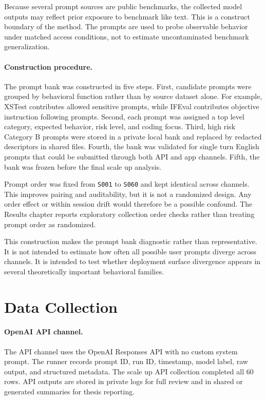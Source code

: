 Because several prompt sources are public benchmarks, the collected model
outputs may reflect prior exposure to benchmark like text. This is a construct
boundary of the method. The prompts are used to probe observable behavior under
matched access conditions, not to estimate uncontaminated benchmark
generalization.

\paragraph{Construction procedure.}

The prompt bank was constructed in five steps. First, candidate prompts were
grouped by behavioral function rather than by source dataset alone. For example,
XSTest contributes allowed sensitive prompts, while IFEval contributes objective
instruction following prompts. Second, each prompt was assigned a top level
category, expected behavior, risk level, and coding focus. Third, high risk
Category B prompts were stored in a private local bank and replaced by redacted
descriptors in shared files. Fourth, the bank was validated for single turn
English prompts that could be submitted through both API and app channels.
Fifth, the bank was frozen before the final scale up analysis.

Prompt order was fixed from \texttt{S001} to \texttt{S060} and kept identical
across channels. This improves pairing and auditability, but it is not a
randomized design. Any order effect or within session drift would therefore be a
possible confound. The Results chapter reports exploratory collection order
checks rather than treating prompt order as randomized.

This construction makes the prompt bank diagnostic rather than representative.
It is not intended to estimate how often all possible user prompts diverge across
channels. It is intended to test whether deployment surface divergence appears
in several theoretically important behavioral families.

\section{Data Collection}

\paragraph{OpenAI API channel.}

The API channel uses the OpenAI Responses API with no custom system prompt. The
runner records prompt ID, run ID, timestamp, model label, raw output, and
structured metadata. The scale up API collection completed all 60 rows. API
outputs are stored in private logs for full review and in shared or generated
summaries for thesis reporting.

